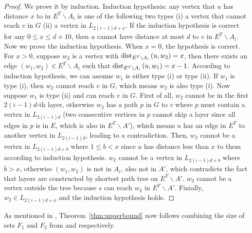 \begin{proof}
	We prove it by induction. Induction hypothesis: any vertex that $u$ has distance $x$ to in $E^T\backslash A_i$ is one of the following two types (i) a vertex that cannot reach $v$ in $G$ (ii) a vertex in $L_{2(i-1)d+x}$. If the induction hypothesis is correct for any $0\le x\le d+10$, then $u$ cannot have distance at most $d$ to $v$ in $E^T\backslash A_i$. Now we prove the induction hypothesis. When $x=0$, the hypothesis is correct. For $x>0$, suppose $w_2$ is a vertex with $\text{dist}_{E^T\backslash A_i}\left(u,w_2\right)=x$, then there exists an edge $(w_1,w_2)\in E^T\backslash A_i$ such that $\text{dist}_{E^T\backslash A_i}\left(u,w_1\right)=x-1$. According to induction hypothesis, we can assume $w_1$ is either type (i) or type (ii). If $w_1$ is type (i), then $w_2$ cannot reach $v$ in $G$, which means $w_2$ is also type (i). Now suppose $w_1$ is type (ii) and can reach $v$ in $G$. First of all, $w_2$ cannot be in the first $2(i-1)d$-th layer, otherwise $w_2$ has a path $p$ in $G$ to $v$ where $p$ must contain a vertex in $L_{2(i-1)d}$ (two consecutive vertices in $p$ cannot skip a layer since all edges in $p$ is in $E$, which is also in $E^T\backslash A'$), which means $u$ has an edge in $E^T$ to another vertex in $L_{2(i-1)d}$, leading to a contradiction. Then, $w_2$ cannot be a vertex in $L_{2(i-1)d+b}$ where $1\le b<x$ since $u$ has distance less than $x$ to them according to induction hypothesis. $w_2$ cannot be a vertex in $L_{2(i-1)d+b}$ where $b>x$, otherwise $(w_1,w_2)$ is not in $A_i$, also not in $A'$, which contradicts the fact that layers are constructed by shortest path tree on $E^T\backslash A'$. $w_2$ cannot be a vertex outside the tree because $s$ can reach $w_2$ in $E^T\backslash A'$. Finially, $w_2\in L_{2(i-1)d+x}$ and the induction hypothesis holds. 
\end{proof}

As mentioned in , Theorem~\ref{thm:upperbound} now follows combining the size of sets $F_1$ and $F_2$ from  and  respectively.


 
